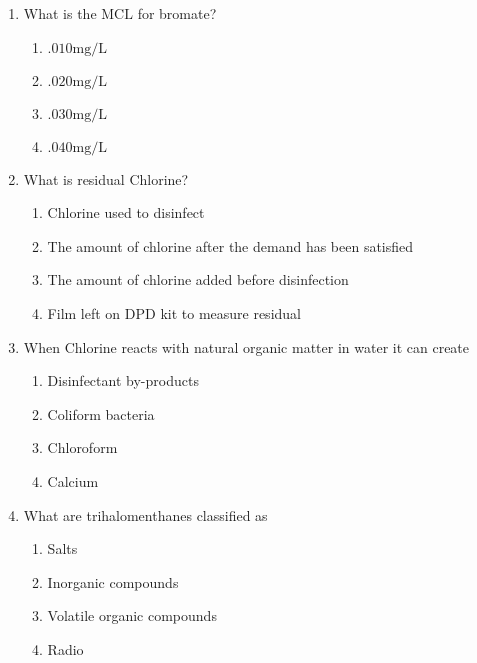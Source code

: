 \documentclass{article}
\begin{document}
\begin{enumerate}
\item What is the $\mathrm{MCL}$ for bromate?\\
\begin{enumerate}
\item $.010 \mathrm{mg} / \mathrm{L}$\\
\item $.020 \mathrm{mg} / \mathrm{L}$\\
\item $.030 \mathrm{mg} / \mathrm{L}$\\
\item $.040 \mathrm{mg} / \mathrm{L}$
\end{enumerate}

\item What is residual Chlorine?\\
\begin{enumerate}
\item Chlorine used to disinfect\\
\item The amount of chlorine after the demand has been satisfied\\
\item The amount of chlorine added before disinfection\\
\item Film left on DPD kit to measure residual
\end{enumerate}

\item  When Chlorine reacts with natural organic matter in water it can create\\
\begin{enumerate}
\item Disinfectant by-products\\
\item Coliform bacteria\\
\item Chloroform\\
\item Calcium
\end{enumerate}

\item  What are trihalomenthanes classified as\\
\begin{enumerate}
\item Salts\\
\item Inorganic compounds\\
\item Volatile organic compounds\\
\item Radio
\end{enumerate}


\end{enumerate}
\end{document}
